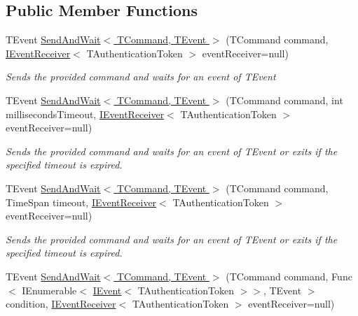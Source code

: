 \subsection*{Public Member Functions}
\begin{DoxyCompactItemize}
\item 
T\+Event \hyperlink{interfaceCqrs_1_1Commands_1_1ISendAndWaitCommandSender_ab64dd5144f0688b0e23ffe289d4ffa2e}{Send\+And\+Wait$<$ T\+Command, T\+Event $>$} (T\+Command command, \hyperlink{interfaceCqrs_1_1Events_1_1IEventReceiver}{I\+Event\+Receiver}$<$ T\+Authentication\+Token $>$ event\+Receiver=null)
\begin{DoxyCompactList}\small\item\em Sends the provided {\itshape command}  and waits for an event of {\itshape T\+Event}  \end{DoxyCompactList}\item 
T\+Event \hyperlink{interfaceCqrs_1_1Commands_1_1ISendAndWaitCommandSender_aceee36522f8b677f3737ff0f9f2165ad}{Send\+And\+Wait$<$ T\+Command, T\+Event $>$} (T\+Command command, int milliseconds\+Timeout, \hyperlink{interfaceCqrs_1_1Events_1_1IEventReceiver}{I\+Event\+Receiver}$<$ T\+Authentication\+Token $>$ event\+Receiver=null)
\begin{DoxyCompactList}\small\item\em Sends the provided {\itshape command}  and waits for an event of {\itshape T\+Event}  or exits if the specified timeout is expired. \end{DoxyCompactList}\item 
T\+Event \hyperlink{interfaceCqrs_1_1Commands_1_1ISendAndWaitCommandSender_ada9643fbf8206bcc72cc5817f747ada8}{Send\+And\+Wait$<$ T\+Command, T\+Event $>$} (T\+Command command, Time\+Span timeout, \hyperlink{interfaceCqrs_1_1Events_1_1IEventReceiver}{I\+Event\+Receiver}$<$ T\+Authentication\+Token $>$ event\+Receiver=null)
\begin{DoxyCompactList}\small\item\em Sends the provided {\itshape command}  and waits for an event of {\itshape T\+Event}  or exits if the specified timeout is expired. \end{DoxyCompactList}\item 
T\+Event \hyperlink{interfaceCqrs_1_1Commands_1_1ISendAndWaitCommandSender_abc9bda930a4c8c57d8edf1044d2b8002}{Send\+And\+Wait$<$ T\+Command, T\+Event $>$} (T\+Command command, Func$<$ I\+Enumerable$<$ \hyperlink{interfaceCqrs_1_1Events_1_1IEvent}{I\+Event}$<$ T\+Authentication\+Token $>$$>$, T\+Event $>$ condition, \hyperlink{interfaceCqrs_1_1Events_1_1IEventReceiver}{I\+Event\+Receiver}$<$ T\+Authentication\+Token $>$ event\+Receiver=null)
$$
\end{DoxyCompactItemize}
